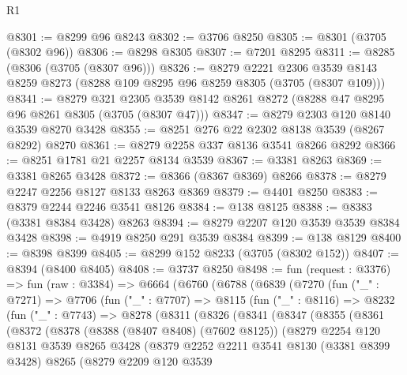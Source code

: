\begin{lexlean}{R1}
\begin{coremodule}
@8301 := @8299 @96 @8243
@8302 := @3706 @8250
@8305 := @8301 (@3705 (@8302 @96))
@8306 := @8298 @8305
@8307 := @7201 @8295
@8311 := @8285 (@8306 (@3705 (@8307 @96)))
@8326 := @8279
    @2221
    @2306
    @3539
    @8143
    @8259
    @8273
    (@8288 @109 @8295 @96 @8259 @8305 (@3705 (@8307 @109)))
@8341 := @8279
    @321
    @2305
    @3539
    @8142
    @8261
    @8272
    (@8288 @47 @8295 @96 @8261 @8305 (@3705 (@8307 @47)))
@8347 := @8279 @2303 @120 @8140 @3539 @8270 @3428
@8355 := @8251 @276 @22 @2302 @8138 @3539 (@8267 @8292) @8270
@8361 := @8279 @2258 @337 @8136 @3541 @8266 @8292
@8366 := @8251 @1781 @21 @2257 @8134 @3539
@8367 := @3381 @8263
@8369 := @3381 @8265 @3428
@8372 := @8366 (@8367 @8369) @8266
@8378 := @8279 @2247 @2256 @8127 @8133 @8263 @8369
@8379 := @4401 @8250
@8383 := @8379 @2244 @2246 @3541 @8126
@8384 := @138 @8125
@8388 := @8383 (@3381 @8384 @3428) @8263
@8394 := @8279 @2207 @120 @3539 @3539 @8384 @3428
@8398 := @4919 @8250 @291 @3539 @8384
@8399 := @138 @8129
@8400 := @8398 @8399
@8405 := @8299 @152 @8233 (@3705 (@8302 @152))
@8407 := @8394 (@8400 @8405)
@8408 := @3737 @8250
@8498 := fun (request : @3376) =>
  fun (raw : @3384) =>
  @6664
    (@6760
      (@6788
        (@6839
          (@7270
            (fun ("_" : @7271) =>
            @7706
              (fun ("_" : @7707) =>
              @8115
                (fun ("_" : @8116) =>
                @8232
                  (fun ("_" : @7743) =>
                  @8278
                    (@8311
                      (@8326
                        (@8341
                          (@8347
                            (@8355
                              (@8361
                                (@8372
                                  (@8378
                                    (@8388 (@8407 @8408) (@7602 @8125))
                                    (@8279
                                      @2254
                                      @120
                                      @8131
                                      @3539
                                      @8265
                                      @3428
                                      (@8379
                                        @2252
                                        @2211
                                        @3541
                                        @8130
                                        (@3381 @8399 @3428)
                                        @8265
                                        (@8279
                                          @2209
                                          @120
                                          @3539

\end{coremodule}
\end{lexlean}
